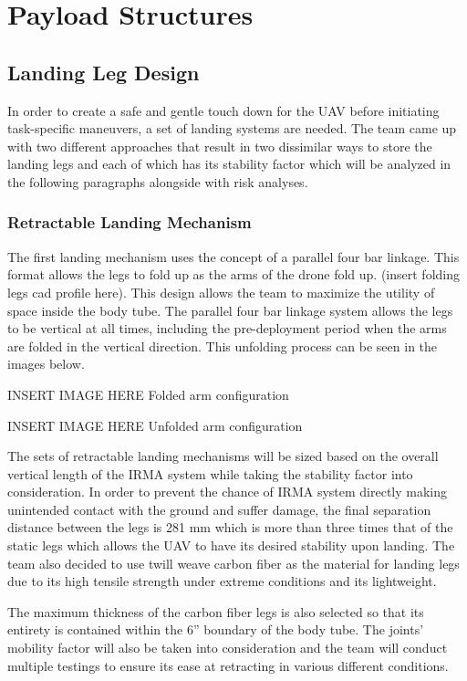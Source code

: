         

\section{Payload Structures}\label{PL:Tradeoffs:Structures}
	\subsection{Landing Leg Design}
		In order to create a safe and gentle touch down for the UAV before initiating task-specific maneuvers, a set of landing systems are needed. The team came up with two different approaches that result in two dissimilar ways to store the landing legs and each of which has its stability factor which will be analyzed in the following paragraphs alongside with risk analyses.
		\subsubsection{Retractable Landing Mechanism}
			The first landing mechanism uses the concept of a parallel four bar linkage. This format allows the legs to fold up as the arms of the drone fold up. (insert folding legs cad profile here). This design allows the team to maximize the utility of space inside the body tube. The parallel four bar linkage system allows the legs to be vertical at all times, including the pre-deployment period when the arms are folded in the vertical direction. This unfolding process can be seen in the images below.

            INSERT IMAGE HERE
            Folded arm configuration

            INSERT IMAGE HERE
            Unfolded arm configuration

			The sets of retractable landing mechanisms will be sized based on the overall vertical length of the IRMA system while taking the stability factor into consideration. In order to prevent the chance of IRMA system directly making unintended contact with the ground and suffer damage, the final separation distance between the legs is 281 mm which is more than three times that of the static legs which allows the UAV to have its desired stability upon landing. The team also decided to use twill weave carbon fiber as the material for landing legs due to its high tensile strength under extreme conditions and its lightweight. 

            The maximum thickness of the carbon fiber legs is also selected so that its entirety is contained within the 6” boundary of the body tube. The joints’ mobility factor will also be taken into consideration and the team will conduct multiple testings to ensure its ease at retracting in various different conditions.


